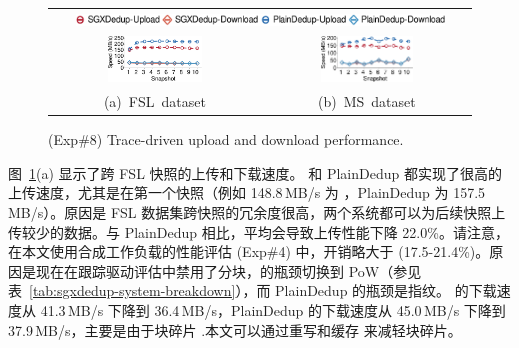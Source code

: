 \begin{figure}[t]
  \centering
  \begin{tabular}{@{\ }c@{\ }c}
  \multicolumn{2}{c}{\includegraphics[width=0.9\textwidth]{pic/sgxdedup/expb2_trace_legend.pdf}} \\
  \hspace{-0.1in}
  \includegraphics[width=0.47\textwidth]{pic/sgxdedup/expb2_trace_fsl_plain_sgx.pdf} &
  \includegraphics[width=0.47\textwidth]{pic/sgxdedup/expb2_trace_ms_plain_sgx.pdf}
  \vspace{-3pt}\\
  \mbox{\small (a) FSL dataset} &
  \mbox{\small (b) MS dataset}
  \end{tabular}
  \vspace{-6pt}
  \caption{(Exp\#8) Trace-driven upload and download performance.}
  \label{fig:sgxdedup-tracePerformance}
\end{figure}

图~\ref{fig:sgxdedup-tracePerformance}(a) 显示了跨 FSL 快照的上传和下载速度。 \sysnameS 和 PlainDedup 都实现了很高的上传速度，尤其是在第一个快照（例如 148.8\,MB/s \sysnameS 为 ，PlainDedup 为 157.5\,MB/s）。原因是 FSL 数据集跨快照的冗余度很高，两个系统都可以为后续快照上传较少的数据。与 PlainDedup 相比，\sysnameS 平均会导致上传性能下降 22.0\%。请注意，在本文使用合成工作负载的性能评估 (Exp\#4) 中，开销略大于 (17.5-21.4\%)。原因是现在在跟踪驱动评估中禁用了分块，\sysnameS 的瓶颈切换到 PoW（参见表~\ref{tab:sgxdedup-system-breakdown}），而 PlainDedup 的瓶颈是指纹。 \sysnameS 的下载速度从 41.3\,MB/s 下降到 36.4\,MB/s，PlainDedup 的下载速度从 45.0\,MB/s 下降到 37.9\,MB/s，主要是由于块碎片 \cite{lillibridge13} .本文可以通过重写和缓存 \cite{lillibridge13,cao2018ALACC} 来减轻块碎片。


